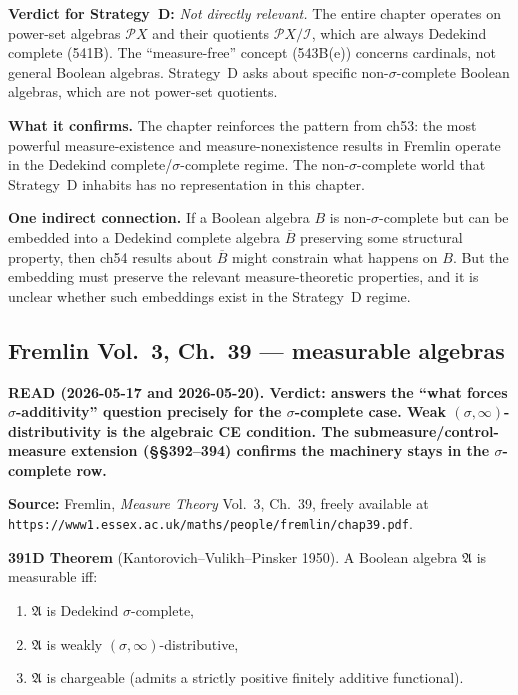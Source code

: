 \textbf{Verdict for Strategy~D:} \emph{Not directly relevant.}
The entire chapter operates on power-set algebras $\mathcal{P}X$
and their quotients $\mathcal{P}X / \mathcal{I}$, which are always
Dedekind complete (541B).  The ``measure-free'' concept (543B(e))
concerns cardinals, not general Boolean algebras.  Strategy~D asks
about specific non-$\sigma$-complete Boolean algebras, which are not
power-set quotients.

\textbf{What it confirms.}  The chapter reinforces the pattern
from ch53: the most powerful measure-existence and
measure-nonexistence results in Fremlin operate in the Dedekind
complete/$\sigma$-complete regime.  The non-$\sigma$-complete world
that Strategy~D inhabits has no representation in this chapter.

\textbf{One indirect connection.}  If a Boolean algebra $B$ is
non-$\sigma$-complete but can be embedded into a Dedekind complete
algebra $\overline{B}$ preserving some structural property, then
ch54 results about $\overline{B}$ might constrain what happens on
$B$.  But the embedding must preserve the relevant measure-theoretic
properties, and it is unclear whether such embeddings exist in the
Strategy~D regime.

\subsection*{Fremlin Vol.~3, Ch.~39 --- measurable algebras}

\textbf{READ (2026-05-17 and 2026-05-20).  Verdict: answers the
``what forces $\sigma$-additivity'' question precisely for the
$\sigma$-complete case.  Weak $(\sigma,\infty)$-distributivity is
the algebraic CE condition.  The submeasure/control-measure
extension (\S\S 392--394) confirms the machinery stays in the
$\sigma$-complete row.}

\medskip\noindent
\textbf{Source:} Fremlin, \emph{Measure Theory} Vol.~3, Ch.~39,
freely available at
\texttt{https://www1.essex.ac.uk/maths/people/fremlin/chap39.pdf}.

\medskip\noindent
\textbf{391D Theorem} (Kantorovich--Vulikh--Pinsker 1950).  A
Boolean algebra $\mathfrak{A}$ is measurable iff:
\begin{enumerate}[nosep]
  \item $\mathfrak{A}$ is Dedekind $\sigma$-complete,
  \item $\mathfrak{A}$ is weakly $(\sigma,\infty)$-distributive,
  \item $\mathfrak{A}$ is chargeable (admits a strictly positive
    finitely additive functional).
\end{enumerate}

